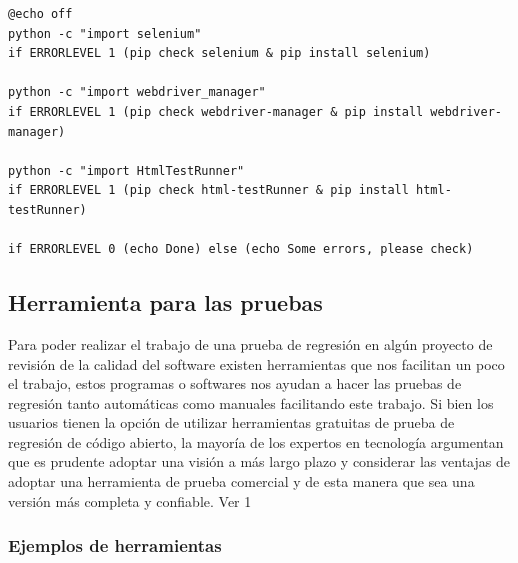 \documentclass[conference]{IEEEtran}
\begin{document}
\begin{lstlisting}[style=CMD]
@echo off
python -c "import selenium"
if ERRORLEVEL 1 (pip check selenium & pip install selenium)

python -c "import webdriver_manager"
if ERRORLEVEL 1 (pip check webdriver-manager & pip install webdriver-manager)

python -c "import HtmlTestRunner"
if ERRORLEVEL 1 (pip check html-testRunner & pip install html-testRunner)

if ERRORLEVEL 0 (echo Done) else (echo Some errors, please check)
\end{lstlisting}

\subsection{Herramienta para las pruebas}

Para poder realizar el trabajo de una prueba de regresión en algún proyecto de revisión de la calidad del software existen herramientas que nos facilitan un poco el trabajo, estos programas o softwares nos ayudan a hacer las pruebas de regresión tanto automáticas como manuales facilitando este trabajo.
Si bien los usuarios tienen la opción de utilizar herramientas gratuitas de prueba de regresión de código abierto, la mayoría de los expertos en tecnología argumentan que es prudente adoptar una visión a más largo plazo y considerar las ventajas de adoptar una herramienta de prueba comercial y de esta manera que sea una versión más completa y confiable. Ver 1

\subsubsection{Ejemplos de herramientas}
\end{document}
